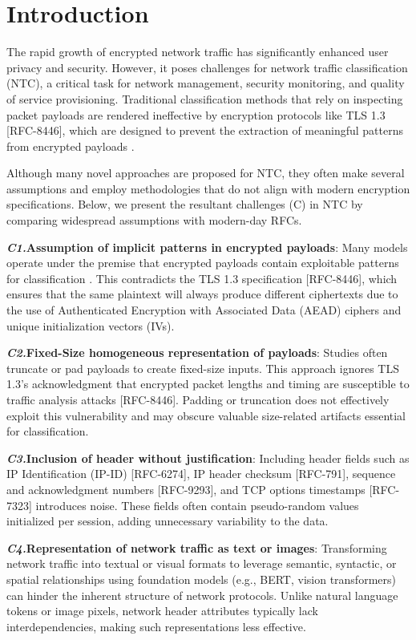 \section{Introduction}
The rapid growth of encrypted network traffic has significantly enhanced user privacy and security. However, it poses challenges for network traffic classification (NTC), a critical task for network management, security monitoring, and quality of service provisioning. Traditional classification methods that rely on inspecting packet payloads are rendered ineffective by encryption protocols like TLS 1.3 [RFC-8446], which are designed to prevent the extraction of meaningful patterns from encrypted payloads \cite{foundation_et_bert}.

Although many novel approaches are proposed for NTC, they often make several assumptions and employ methodologies that do not align with modern encryption specifications. Below, we present the resultant challenges (C) in NTC by comparing widespread assumptions with modern-day RFCs.

\textbf{\textit{C1.}Assumption of implicit patterns in encrypted payloads}: Many models operate under the premise that encrypted payloads contain exploitable patterns for classification \cite{foundation_et_bert, foundation_yatc_full}. This contradicts the TLS 1.3 specification [RFC-8446], which ensures that the same plaintext will always produce different ciphertexts due to the use of Authenticated Encryption with Associated Data (AEAD) ciphers and unique initialization vectors (IVs).

\textbf{\textit{C2.}Fixed-Size homogeneous representation of payloads}: Studies often truncate or pad payloads to create fixed-size inputs. This approach ignores TLS 1.3's acknowledgment that encrypted packet lengths and timing are susceptible to traffic analysis attacks [RFC-8446]. Padding or truncation does not effectively exploit this vulnerability and may obscure valuable size-related artifacts essential for classification.

\textbf{\textit{C3.}Inclusion of header without justification}: Including header fields such as IP Identification (IP-ID) [RFC-6274], IP header checksum [RFC-791], sequence and acknowledgment numbers [RFC-9293], and TCP options timestamps [RFC-7323] introduces noise. These fields often contain pseudo-random values initialized per session, adding unnecessary variability to the data.

\textbf{\textit{C4.}Representation of network traffic as text or images}: Transforming network traffic into textual or visual formats to leverage semantic, syntactic, or spatial relationships using  foundation models (e.g., BERT, vision transformers) can hinder the inherent structure of network protocols. Unlike natural language tokens or image pixels, network header attributes typically lack interdependencies, making such representations less effective.


